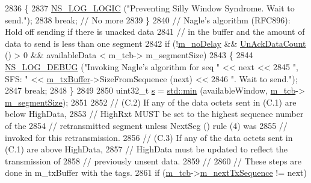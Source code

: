 \begin{DoxyCode}
2836             \{
2837               \hyperlink{group__logging_ga88acd260151caf2db9c0fc84997f45ce}{NS\_LOG\_LOGIC} (\textcolor{stringliteral}{"Preventing Silly Window Syndrome. Wait to send."});
2838               \textcolor{keywordflow}{break}; \textcolor{comment}{// No more}
2839             \}
2840           \textcolor{comment}{// Nagle's algorithm (RFC896): Hold off sending if there is unacked data}
2841           \textcolor{comment}{// in the buffer and the amount of data to send is less than one segment}
2842           \textcolor{keywordflow}{if} (!\hyperlink{classns3_1_1TcpSocketBase_ad358f0bbed41f6b13d474c49db493223}{m\_noDelay} && \hyperlink{classns3_1_1TcpSocketBase_aba0c8b002908bfa8cd170b793df747bc}{UnAckDataCount} () > 0 && availableData < m\_tcb->
      m\_segmentSize)
2843             \{
2844               \hyperlink{group__logging_ga413f1886406d49f59a6a0a89b77b4d0a}{NS\_LOG\_DEBUG} (\textcolor{stringliteral}{"Invoking Nagle's algorithm for seq "} << next <<
2845                             \textcolor{stringliteral}{", SFS: "} << \hyperlink{classns3_1_1TcpSocketBase_a4a1b53982ffd851bd07ab8d5005c130e}{m\_txBuffer}->SizeFromSequence (next) <<
2846                             \textcolor{stringliteral}{". Wait to send."});
2847               \textcolor{keywordflow}{break};
2848             \}
2849 
2850           uint32\_t \hyperlink{generate__test__data__lte__sinr_8m_ad83eeb3a142285d1243a08c6b7026df8}{s} = \hyperlink{80211b_8c_ac6afabdc09a49a433ee19d8a9486056d}{std::min} (availableWindow, \hyperlink{classns3_1_1TcpSocketBase_a26bbaf59001308dc43fb630d76f2e38b}{m\_tcb}->
      \hyperlink{classns3_1_1TcpSocketState_a079872f7b0099ef5f3cab4ff47bd2edd}{m\_segmentSize});
2851 
2852           \textcolor{comment}{// (C.2) If any of the data octets sent in (C.1) are below HighData,}
2853           \textcolor{comment}{//       HighRxt MUST be set to the highest sequence number of the}
2854           \textcolor{comment}{//       retransmitted segment unless NextSeg () rule (4) was}
2855           \textcolor{comment}{//       invoked for this retransmission.}
2856           \textcolor{comment}{// (C.3) If any of the data octets sent in (C.1) are above HighData,}
2857           \textcolor{comment}{//       HighData must be updated to reflect the transmission of}
2858           \textcolor{comment}{//       previously unsent data.}
2859           \textcolor{comment}{//}
2860           \textcolor{comment}{// These steps are done in m\_txBuffer with the tags.}
2861           \textcolor{keywordflow}{if} (\hyperlink{classns3_1_1TcpSocketBase_a26bbaf59001308dc43fb630d76f2e38b}{m\_tcb}->\hyperlink{classns3_1_1TcpSocketState_ad1f77b1cbdb9267a89ebb6f16ac76892}{m\_nextTxSequence} != next)

\end{DoxyCode}
